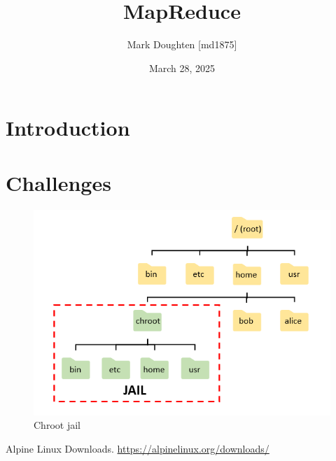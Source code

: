 \documentclass{article}
\title{MapReduce}
\author{Mark Doughten [md1875]}
\date{March 28, 2025}
\begin{document}
\maketitle
\section{Introduction}

\section{Challenges}

\begin{figure}[ht]
    \centering
    \includegraphics[width=1\linewidth]{./images/Chroot-1.png}
    \caption{Chroot jail \cite{chroot-jail}}
    \label{fig:chroot}
\end{figure}

\begin{thebibliography}{}
\raggedright

Alpine Linux Downloads.
\href{https://alpinelinux.org/downloads/}{https://alpinelinux.org/downloads/}

\end{thebibliography}
\end{document}
